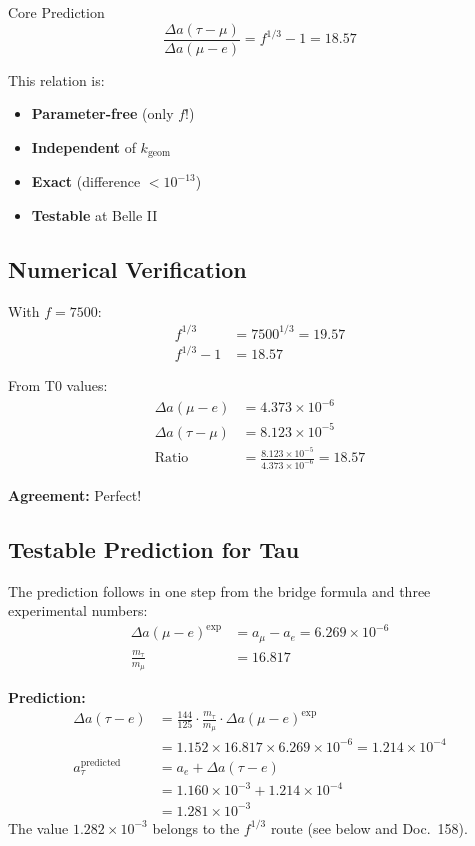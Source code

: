 	\begin{important}{Core Prediction}
		\begin{equation}
			\boxed{\frac{\Delta a(\tau - \mu)}{\Delta a(\mu - e)} = f^{1/3} - 1 = 18.57}
		\end{equation}
		
		This relation is:
		\begin{itemize}
			\item \textbf{Parameter-free} (only $f$!)
			\item \textbf{Independent} of $k_{\text{geom}}$
			\item \textbf{Exact} (difference $< 10^{-13}$)
			\item \textbf{Testable} at Belle II
		\end{itemize}
	\end{important}
	
	\subsection{Numerical Verification}
	
	With $f = 7500$:
	\begin{align}
		f^{1/3} &= 7500^{1/3} = 19.57 \\
		f^{1/3} - 1 &= 18.57
	\end{align}
	
	From T0 values:
	\begin{align}
		\Delta a(\mu - e) &= 4.373 \times 10^{-6} \\
		\Delta a(\tau - \mu) &= 8.123 \times 10^{-5} \\
		\text{Ratio} &= \frac{8.123 \times 10^{-5}}{4.373 \times 10^{-6}} = 18.57
	\end{align}
	
	\textbf{Agreement:} Perfect! \checkmark{}\checkmark{}\checkmark{}
	
	\subsection{Testable Prediction for Tau}
	
	The prediction follows in one step from the bridge formula and three experimental numbers:
	\begin{align}
		\Delta a(\mu - e)^{\text{exp}} &= a_\mu - a_e = 6.269 \times 10^{-6} \\
		\frac{m_\tau}{m_\mu} &= 16.817
	\end{align}
	
	\textbf{Prediction:}
	\begin{align}
		\Delta a(\tau - e) &= \frac{144}{125} \cdot \frac{m_\tau}{m_\mu} \cdot \Delta a(\mu - e)^{\text{exp}} \\
		&= 1.152 \times 16.817 \times 6.269 \times 10^{-6} = 1.214 \times 10^{-4} \\
		a_\tau^{\text{predicted}} &= a_e + \Delta a(\tau - e) \\
		&= 1.160 \times 10^{-3} + 1.214 \times 10^{-4} \\
		&= \boxed{1.281 \times 10^{-3}}
	\end{align}
	The value $1.282 \times 10^{-3}$ belongs to the $f^{1/3}$ route (see below and Doc.~158).
	
